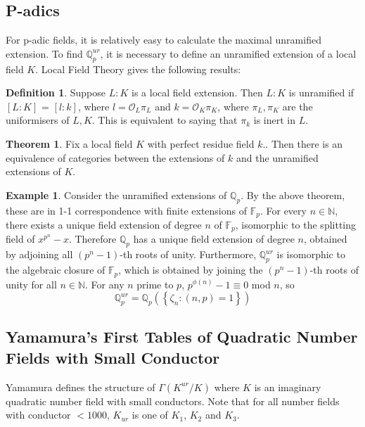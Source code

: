 \documentclass[12pt]{extarticle}
\newcommand{\N}{\mathbb{N}}
\newcommand{\F}{\mathbb{F}}
\newcommand{\Q}{\mathbb{Q}}
\newcommand{\co}{\mathcal{O}}
\newcommand{\<}{\langle}
\renewcommand{\>}{\rangle}
\theoremstyle{definition}
\newtheorem{theorem}{Theorem}
\newtheorem*{definition}{Definition}
\newtheorem*{example}{Example}
\begin{document}
\subsection{P-adics}
For p-adic fields, it is relatively easy to calculate the maximal unramified extension. 
To find $\Q_p^{ur}$, it is necessary to define an unramified extension of a local field $K$. Local Field Theory gives the following results:
\begin{definition}
Suppose $L:K$ is a local field extension. Then $L:K$ is unramified if $[L:K]$ = $[l:k]$, where $l = \co_L\pi_L$ and $ k= \co_K\pi_K$, where $\pi_L,\pi_K$ are the uniformisers of $L,K$. This is equivalent to saying that $\pi_k$ is inert in $L$. 
\end{definition}
\begin{theorem}
Fix a local field $K$ with perfect residue field $k$.. Then there is an equivalence of categories
between the extensions of $k$ and the unramified extensions of $K$. 
\end{theorem}
\begin{example}
Consider the unramified extensions of $\Q_p$. By the above theorem, these are in 1-1 correspondence with finite extensions of $\F_p$. For every $n \in \N$, there exists a unique field extension of degree $n$ of $\F_p$, isomorphic to the splitting field of $x^{p^n}-x$. Therefore $\Q_p$ has a unique field extension of degree $n$, obtained by adjoining all $\left( p^n-1\right)$-th roots of unity. Furthermore,
$\Q_p^{ur}$ is isomorphic to the algebraic closure of $\F_p$, which is obtained by joining the $\left( p^n-1\right)$-th roots of unity for all $n \in \N$. For any $n$ prime to $p$, $p^{\phi(n)}-1 \equiv 0$ mod $n$, so 
\begin{equation}
\Q_p^{ur} = \Q_p(\left\{ \zeta_n: (n,p)=1 \right\})
\end{equation}
\end{example}
\subsection{Yamamura's First Tables of Quadratic Number Fields with Small Conductor}
Yamamura \cite{YAMA1997} defines the structure of $\Gamma(K^{ur}/K)$ where $K$ is an imaginary quadratic number field with small conductors. Note that for all number fields with conductor $<1000$, $K_{ur}$ is one of $K_1$, $K_2$ and $K_3$. \par 
\end{document}
